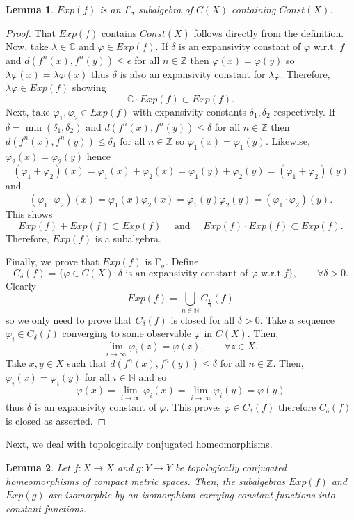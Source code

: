 \documentclass[11pt,letterpaper]{amsart}
\newtheorem{lem}{Lemma}
\begin{document}
\begin{lem}
\label{lobo}
$Exp(f)$ is an F$_\sigma$ subalgebra of $C(X)$ containing $Const(X)$.
\end{lem}

\begin{proof}
That $Exp(f)$ contains $Const(X)$ follows directly from the definition.
Now, take $\lambda\in\mathbb{C}$ and $\varphi\in Exp(f)$.
If $\delta$ is an expansivity constant of $\varphi$ w.r.t. $f$
and $d(f^n(x),f^n(y))\leq\epsilon$ for all $n\in\mathbb{Z}$ then
$\varphi(x)=\varphi(y)$ so $\lambda\varphi(x)=\lambda\varphi(x)$
thus $\delta$ is also an expansivity constant for $\lambda\varphi$.
Therefore, $\lambda\varphi\in Exp(f)$ showing
$$
\mathbb{C}\cdot Exp(f)\subset Exp(f).
$$
Next, take $\varphi_1,\varphi_2\in Exp(f)$ with expansivity constants
$\delta_1,\delta_2$ respectively.
If $\delta=\min(\delta_1,\delta_2)$ and
$d(f^n(x),f^n(y))\leq\delta$ for all $n\in\mathbb{Z}$ then
$d(f^n(x),f^n(y))\leq\delta_1$ for all $n\in\mathbb{Z}$ so
$\varphi_1(x)=\varphi_1(y)$.
Likewise, $\varphi_2(x)=\varphi_2(y)$ hence
$$
(\varphi_1+\varphi_2)(x)=\varphi_1(x)+\varphi_2(x)=\varphi_1(y)+\varphi_2(y)=(\varphi_1+\varphi_2)(y)
$$
and
$$
(\varphi_1\cdot\varphi_2)(x)=\varphi_1(x)\varphi_2(x)=\varphi_1(y)\varphi_2(y)=(\varphi_1\cdot\varphi_2)(y).
$$
This shows
$$
Exp(f)+Exp(f)\subset Exp(f)\quad\mbox{ and }\quad Exp(f)\cdot Exp(f)\subset Exp(f).
$$
Therefore, $Exp(f)$ is a subalgebra.

Finally, we prove that $Exp(f)$ is F$_\sigma$. Define
$$
C_\delta(f)=\{\varphi\in C(X):\delta\mbox{ is an expansivity constant of $\varphi$ w.r.t.}f\},\quad\quad\forall \delta>0.
$$
Clearly
$$
Exp(f)=\bigcup_{n\in\mathbb{N}}C_{\frac{1}n}(f)
$$
so we only need to prove that $C_\delta(f)$ is closed for all $\delta>0$.
Take a sequence $\varphi_i\in C_\delta(f)$ converging to some observable
$\varphi$ in $C(X)$. Then,
$$
\lim_{i\to\infty}\varphi_i(z)=\varphi(z),\quad\quad\forall z\in X.
$$
Take $x,y\in X$ such that
$d(f^n(x),f^n(y))\leq\delta$ for all $n\in\mathbb{Z}$.
Then, $\varphi_i(x)=\varphi_i(y)$ for all $i\in\mathbb{N}$ and so
$$
\varphi(x)=\lim_{i\to\infty}\varphi_i(x)=\lim_{i\to\infty}\varphi_i(y)=\varphi(y)
$$
thus $\delta$ is an expansivity constant of $\varphi$.
This proves $\varphi\in C_\delta(f)$ therefore $C_\delta(f)$ is closed as asserted.
\end{proof}

Next, we deal with topologically conjugated homeomorphisms.

\begin{lem}
\label{wrong}
Let $f:X\to X$ and $g:Y\to Y$ be topologically conjugated homeomorphisms of compact metric spaces. Then, the subalgebras
$Exp(f)$ and $Exp(g)$ are isomorphic by an isomorphism carrying constant functions into constant functions.
\end{lem}
\end{document}
